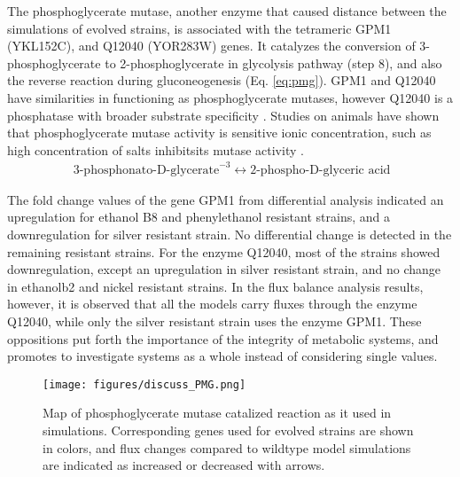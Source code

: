 The phosphoglycerate mutase, another enzyme that caused distance between the simulations of evolved strains, is associated with the tetrameric GPM1 (YKL152C), and Q12040 (YOR283W) genes. It catalyzes the conversion of 3-phosphoglycerate to 2-phosphoglycerate in glycolysis pathway (step 8), and also the reverse reaction during gluconeogenesis (Eq. \ref{eq:pmg}). GPM1 and Q12040 have similarities in functioning as phosphoglycerate mutases, however Q12040 is a phosphatase with broader substrate specificity \cite{ho2009identification}. Studies on animals have shown that phosphoglycerate mutase activity is sensitive ionic concentration, such as high concentration of salts inhibitsits mutase activity \cite{grisolia1967mercury}.
\begin{align}
  \label{eq:pmg}
  \ \text{3-phosphonato-D-glycerate}^{-3} \leftrightarrow \text{2-phospho-D-glyceric acid}
\end{align}

The fold change values of the gene GPM1 from differential analysis indicated an upregulation for ethanol B8 and phenylethanol resistant strains, and a downregulation for silver resistant strain. No differential change is detected in the remaining resistant strains. For the enzyme Q12040, most of the strains showed downregulation, except an upregulation in silver resistant strain, and no change in ethanolb2 and nickel resistant strains. In the flux balance analysis results, however, it is observed that all the models carry fluxes through the enzyme Q12040, while only the silver resistant strain uses the enzyme GPM1. These oppositions put forth the importance of the integrity of metabolic systems, and promotes to investigate systems as a whole instead of considering single values.
\begin{figure}[H]
\texttt{[image: figures/discuss\_PMG.png]}
\caption[Map of phosphoglycerate mutase catalized reaction as it used in simulations]{Map of phosphoglycerate mutase catalized reaction as it used in simulations. Corresponding genes used for evolved strains are shown in colors, and flux changes compared to wildtype model simulations are indicated as increased or decreased with arrows.}
\label{fig:discuss_PMG}
\end{figure}

